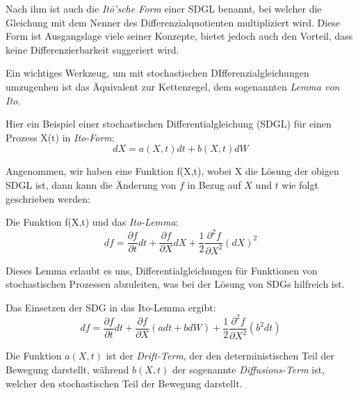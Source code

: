 Nach ihm ist auch die \textit{Itō'sche Form} einer SDGL benannt, bei welcher die Gleichung mit dem Nenner des Differenzialquotienten multipliziert wird. Diese Form ist Ausgangslage viele seiner Konzepte, bietet jedoch auch den Vorteil, dass keine Differenzierbarkeit suggeriert wird.


Ein wichtiges Werkzeug, um mit stochastischen DIfferenzialgleichungen umzugenhen ist das Äquivalent zur Kettenregel, dem sogenannten \textit{Lemma von Ito}. %


Hier ein Beispiel einer stochastischen Differentialgleichung (SDGL) für einen Prozess X(t) in \textit{Ito-Form}:
\begin{equation}
	dX = a(X,t) dt + b(X,t) dW
\end{equation}


Angenommen, wir haben eine Funktion f(X,t), wobei X die Lösung der obigen SDGL ist, dann kann die Änderung von $ f $ in Bezug auf $ X $ und $ t $ wie folgt geschrieben werden:

Die Funktion f(X,t) und das \textit{Ito-Lemma}:
\begin{equation}
	df = \frac{\partial f}{\partial t} dt + \frac{\partial f}{\partial X} dX + \frac{1}{2} \frac{\partial^2 f}{\partial X^2} (dX)^2	
\end{equation}

Dieses Lemma erlaubt es uns, Differentialgleichungen für Funktionen von stochastischen Prozessen abzuleiten, was bei der Lösung von SDGs hilfreich ist.


Das Einsetzen der SDG in das Ito-Lemma ergibt:
\begin{equation}
	df = \frac{\partial f}{\partial t} dt + \frac{\partial f}{\partial X} (a dt + b dW) + \frac{1}{2} \frac{\partial^2 f}{\partial X^2} (b^2 dt)
\end{equation}

Die Funktion $ a(X,t) $ ist der \textit{Drift-Term}, der den deterministischen Teil der Bewegung darstellt, während $ b(X,t) $ der sogenannte \textit{Diffusions-Term} ist, welcher den stochastischen Teil der Bewegung darstellt.




